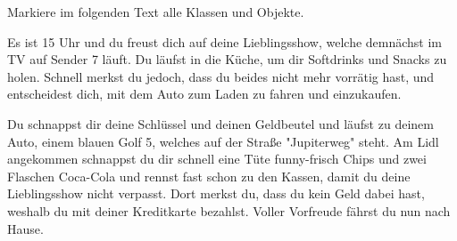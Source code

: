 
\renewcommand{\workingtimeMinutes}{10}
Markiere im folgenden Text alle Klassen und Objekte.

Es ist 15 Uhr und du freust dich auf deine Lieblingsshow, welche demnächst im TV auf Sender 7 läuft. 
Du läufst in die Küche, um dir Softdrinks und Snacks zu holen. Schnell merkst du jedoch, dass du beides nicht mehr vorrätig hast, und entscheidest dich, mit dem Auto zum Laden zu fahren und einzukaufen.

Du schnappst dir deine Schlüssel und deinen Geldbeutel und läufst zu deinem Auto, einem blauen Golf 5, welches auf der Straße "Jupiterweg" steht. 
Am Lidl angekommen schnappst du dir schnell eine Tüte funny-frisch Chips und zwei Flaschen Coca-Cola und rennst fast schon zu den Kassen, damit du deine Lieblingsshow nicht verpasst. Dort merkst du, dass du kein Geld dabei hast, weshalb du mit deiner Kreditkarte bezahlst. Voller Vorfreude fährst du nun nach Hause. 


